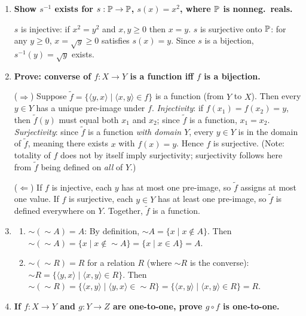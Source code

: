 \begin{enumerate}[{0.}1. ]
\item \textbf{Show $s^{-1}$ exists for $s: \mathbb{P} \to \mathbb{P}$, $s(x)=x^2$, where $\mathbb{P}$ is nonneg.\ reals.}

$s$ is injective: if $x^2 = y^2$ and $x,y \geq 0$ then $x = y$. $s$ is surjective onto $\mathbb{P}$: for any $y \geq 0$, $x = \sqrt{y} \geq 0$ satisfies $s(x)=y$. Since $s$ is a bijection, $s^{-1}(y) = \sqrt{y}$ exists.

\item \textbf{Prove: converse of $f: X \to Y$ is a function iff $f$ is a bijection.}

($\Rightarrow$) Suppose $\tilde{f} = \{\langle y,x\rangle \mid \langle x,y\rangle \in f\}$ is a function (from $Y$ to $X$). Then every $y \in Y$ has a unique pre-image under $f$. \textit{Injectivity}: if $f(x_1)=f(x_2)=y$, then $\tilde{f}(y)$ must equal both $x_1$ and $x_2$; since $\tilde{f}$ is a function, $x_1=x_2$. \textit{Surjectivity}: since $\tilde{f}$ is a function \emph{with domain $Y$}, every $y \in Y$ is in the domain of $\tilde{f}$, meaning there exists $x$ with $f(x)=y$. Hence $f$ is surjective. (Note: totality of $f$ does not by itself imply surjectivity; surjectivity follows here from $\tilde{f}$ being defined on \emph{all} of $Y$.)

($\Leftarrow$) If $f$ is injective, each $y$ has at most one pre-image, so $\tilde{f}$ assigns at most one value. If $f$ is surjective, each $y \in Y$ has at least one pre-image, so $\tilde{f}$ is defined everywhere on $Y$. Together, $\tilde{f}$ is a function.

\item
\begin{enumerate}
\item $\sim(\sim A)= A$: By definition, $\sim A = \{x \mid x \notin A\}$. Then $\sim(\sim A) = \{x \mid x \notin \sim A\} = \{x \mid x \in A\} = A$.

\item $\sim(\sim R)= R$ for a relation $R$ (where $\sim R$ is the converse): $\sim R = \{\langle y,x\rangle \mid \langle x,y\rangle \in R\}$. Then $\sim(\sim R) = \{\langle x,y\rangle \mid \langle y,x\rangle \in \sim R\} = \{\langle x,y\rangle \mid \langle x,y\rangle \in R\} = R$.
\end{enumerate}

\item \textbf{If $f: X\to Y$ and $g: Y\to Z$ are one-to-one, prove $g\circ f$ is one-to-one.}


\end{enumerate}

